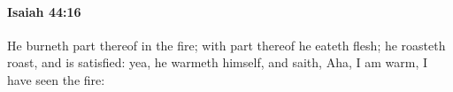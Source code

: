 
		\paragraph{Isaiah 44:16} %
			\label{ISAIAH-44-16}

			He burneth part thereof in the fire; with part thereof he eateth flesh; he roasteth roast, and is satisfied: yea, he warmeth himself, and saith, Aha, I am warm, I have seen the fire:



